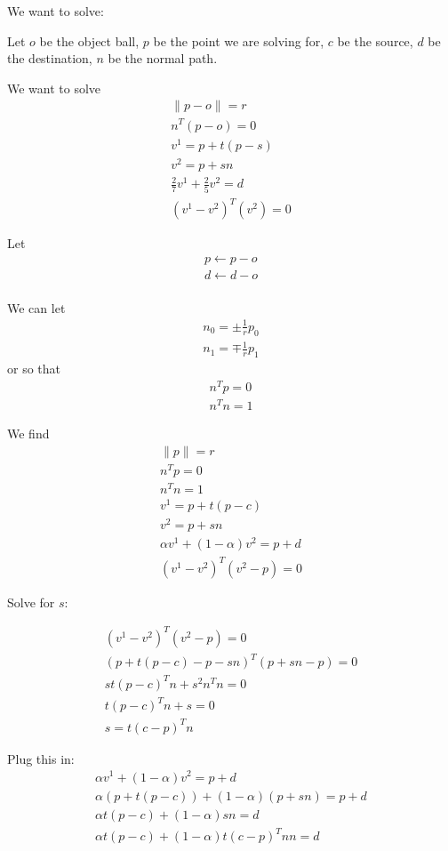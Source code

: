 \documentclass{article}
\begin{document}
We want to solve:


Let $o$ be the object ball,
$p$ be the point we are solving for, 
$c$ be the source,
$d$ be the destination,
$n$ be the normal path.

We want to solve
\begin{align*}
\|p - o\| = r \\
n^T(p - o) = 0 \\
v^1 = p + t(p - s) \\
v^2 = p + s n \\
\frac 2 7 v^1 + \frac 2 5 v^2 = d \\
(v^1 - v^2)^T(v^2) = 0
\end{align*}

Let 
\begin{align*}
p \gets p - o \\
d \gets d - o \\
\end{align*}


We can let
\begin{align*}
n_0 = \pm\frac 1 r p_0 \\
n_1 = \mp\frac 1 r p_1
\end{align*}
or
so that 
\begin{align*}
n^Tp = 0 \\
n^Tn = 1
\end{align*}

We find
\begin{align*}
\|p\| = r \\
n^Tp = 0 \\
n^Tn = 1 \\
v^1 = p + t(p - c) \\
v^2 = p + s n \\
\alpha v^1 + (1 - \alpha) v^2 = p + d \\
(v^1 - v^2)^T(v^2 - p) = 0
\end{align*}

Solve for $s$:

\begin{align*}
(v^1 - v^2)^T(v^2 - p) = 0 \\
(p + t(p - c) - p - s n)^T(p + s n - p) = 0 \\
st(p - c)^Tn + s^2 n^Tn = 0 \\
t(p - c)^Tn + s = 0 \\
s = t(c - p)^Tn
\end{align*}



Plug this in:
\begin{align*}
\alpha v^1 + (1 - \alpha) v^2 = p + d \\
\alpha \left(p + t(p - c)\right) + (1 - \alpha) \left(p + s n\right) = p + d \\
\alpha t(p - c) + (1 - \alpha) s n = d \\
\alpha t(p - c) + (1 - \alpha) t(c - p)^Tn n = d \\
\end{align*}
\end{document}
